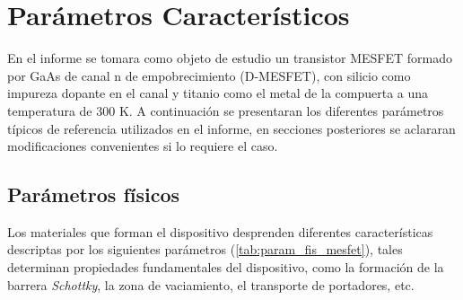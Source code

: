 \documentclass[a4paper]{article}
\begin{document}
\section{Parámetros Característicos}

En el informe se tomara como objeto de estudio un transistor MESFET formado por GaAs de canal n de empobrecimiento (D-MESFET), con silicio como impureza dopante en el canal y titanio como el metal de la compuerta a una temperatura de 300 K. A continuación se presentaran los diferentes parámetros típicos de referencia utilizados en el informe, en secciones posteriores se aclararan modificaciones convenientes si lo requiere el caso.


\subsection{Parámetros físicos}

Los materiales que forman el dispositivo desprenden diferentes características descriptas por los siguientes parámetros (\ref{tab:param_fis_mesfet}), tales determinan propiedades fundamentales del dispositivo, como la formación de la barrera \textit{Schottky}, la zona de vaciamiento, el transporte de portadores, etc.
\end{document}

